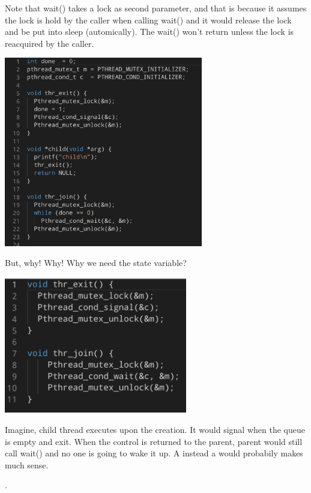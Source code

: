     Note that wait() takes a lock as second parameter, and that is because it assumes the lock 
    is hold by the caller when calling wait() and it would release the lock and be put into sleep
    (automically). The wait() won't return unless the lock is reacquired by the caller.

    \includegraphics[width=0.65\textwidth]{chapters/Cucurrency/Cucurrency/thread_join_with_condition_variable.png}

    But, why! Why! Why we need the state variable?

    \includegraphics[width=0.6\textwidth]{chapters/Cucurrency/Cucurrency/importance_state_variable.png}

    Imagine, child thread executes upon the creation. It would signal when the queue is empty and exit.
    When the control is returned to the parent, parent would still call wait() and no one is going to 
    wake it up. A  instead a  would probabily makes much sense. 


    .

